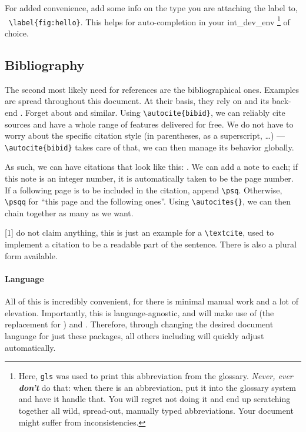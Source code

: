 For added convenience, add some info on the type you are attaching the label to, \ \verb|\label{fig:hello}|.
This helps for auto-completion in your \gls{int_dev_env}%
\footnote{%
	Here, \texttt{gls} was used to print this abbreviation from the glossary.
	\textit{Never, ever \textbf{don't}} do that: when there is an abbreviation, put it into the glossary system and have it handle that.
	You will regret not doing it and end up scratching together all wild, spread-out, manually typed abbreviations.
	Your document might suffer from inconsistencies.}
of choice.

\subsection{Bibliography}
The second most likely need for references are the bibliographical ones.
Examples are spread throughout this document.
At their basis, they rely on  and its back-end .
Forget about  and similar.
Using \verb|\autocite{bibid}|, we can reliably cite sources and have a whole range of features delivered for free.
We do not have to worry about the specific citation style (in parentheses, as a superscript, \dots) --- \verb|\autocite{bibid}| takes care of that, we can then manage its behavior globally.

As such, we can have citations that look like this: \autocites[23]{dixon_fluid_2014}[29\psqq]{aungier_centrifugal_2000}[2-9]{japikse_assessment_1985}[89\psq]{kurzke_correlations_2011}{pampreen_jet-wake_1982}.
We can add a note to each; if this note is an integer number, it is automatically taken to be the page number.
If a following page is to be included in the citation, append \verb|\psq|.
Otherwise, \verb|\psqq| for \enquote{this page and the following ones}.
Using \verb|\autocites{}|, we can then chain together as many as we want.

\textcite{dixon_fluid_2014}[1] do not claim anything, this is just an example for a \verb|\textcite|, used to implement a citation to be a readable part of the sentence.
There is also a plural form available.

\paragraph{Language}
All of this is incredibly convenient, for there is minimal manual work and a lot of elevation.
Importantly, this is language-agnostic, and  will make use of  (the  replacement for ) and .
Therefore, through changing the desired document language for just these packages, all others including  will quickly adjust automatically.

